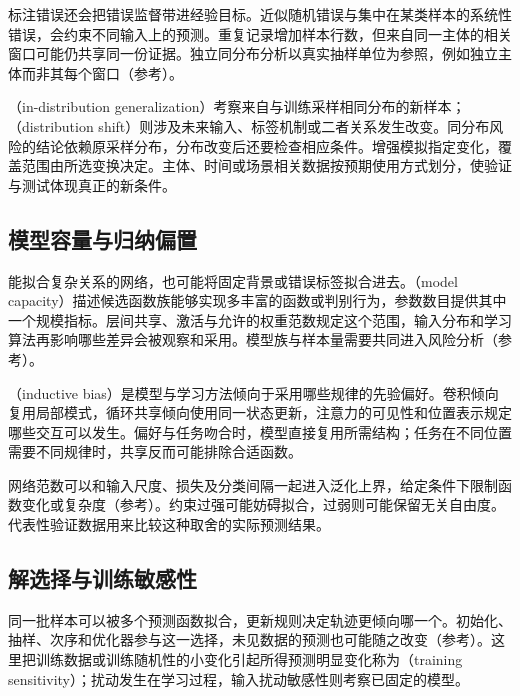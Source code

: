 标注错误还会把错误监督带进经验目标。近似随机错误与集中在某类样本的系统性错误，会约束不同输入上的预测。重复记录增加样本行数，但来自同一主体的相关窗口可能仍共享同一份证据。独立同分布分析以真实抽样单位为参照，例如独立主体而非其每个窗口（参考）。

（in-distribution generalization）考察来自与训练采样相同分布的新样本；（distribution shift）则涉及未来输入、标签机制或二者关系发生改变。同分布风险的结论依赖原采样分布，分布改变后还要检查相应条件。增强模拟指定变化，覆盖范围由所选变换决定。主体、时间或场景相关数据按预期使用方式划分，使验证与测试体现真正的新条件。

\subsection{模型容量与归纳偏置}
\label{sec:generalization-capacity}

能拟合复杂关系的网络，也可能将固定背景或错误标签拟合进去。（model capacity）描述候选函数族能够实现多丰富的函数或判别行为，参数数目提供其中一个规模指标。层间共享、激活与允许的权重范数规定这个范围，输入分布和学习算法再影响哪些差异会被观察和采用。模型族与样本量需要共同进入风险分析（参考）。

（inductive bias）是模型与学习方法倾向于采用哪些规律的先验偏好。卷积倾向复用局部模式，循环共享倾向使用同一状态更新，注意力的可见性和位置表示规定哪些交互可以发生。偏好与任务吻合时，模型直接复用所需结构；任务在不同位置需要不同规律时，共享反而可能排除合适函数。

网络范数可以和输入尺度、损失及分类间隔一起进入泛化上界，给定条件下限制函数变化或复杂度（参考）。约束过强可能妨碍拟合，过弱则可能保留无关自由度。代表性验证数据用来比较这种取舍的实际预测结果。

\subsection{解选择与训练敏感性}
\label{sec:generalization-solution-selection}

同一批样本可以被多个预测函数拟合，更新规则决定轨迹更倾向哪一个。初始化、抽样、次序和优化器参与这一选择，未见数据的预测也可能随之改变（参考）。这里把训练数据或训练随机性的小变化引起所得预测明显变化称为（training sensitivity）；扰动发生在学习过程，输入扰动敏感性则考察已固定的模型。

